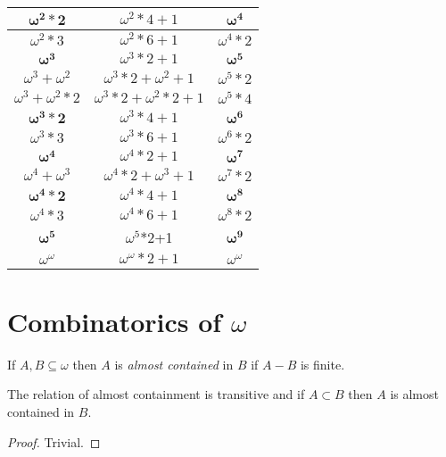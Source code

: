 \documentclass[oneside,12pt]{amsart}
\begin{document}
\begin{tabular}{|c|c|c|}
$\boldsymbol{\omega^2  *2}$ & $\omega^2*4+  1$ & $\boldsymbol{\omega^4}$ \\ \hline \hline
$\omega^2  *3$ & $\omega^2*6+  1$ & $\omega^4*2$ \\ \hline \hline
$\boldsymbol{\omega^3}$ & $\omega^3*2+  1$ & $\boldsymbol{\omega^5}$ \\ \hline \hline
$\omega^3 + \omega^2$ & $\omega^3 *2+ \omega^2 + 1$ & $\omega^5*2$ \\ \hline \hline
$\omega^3 + \omega^2*2$ & $\omega^3*2 + \omega^2*2 + 1$ & $\omega^5*4$ \\ \hline \hline
$\boldsymbol{\omega^3*2}$ & $\omega^3*4+1$ & $\boldsymbol{\omega^6}$ \\ \hline \hline
$\omega^3*3$ & $\omega^3*6+1$ & $\omega^6*2$ \\ \hline \hline
$\boldsymbol{\omega^4}$ & $\omega^4*2+1$ & $\boldsymbol{\omega^7}$ \\ \hline \hline
$\omega^4 + \omega^3$ & $\omega^4*2 + \omega^3 + 1$ & $\omega^7*2$ \\ \hline \hline
$\boldsymbol{\omega^4*2}$ & $\omega^4*4+1$ & $\boldsymbol{\omega^8}$ \\ \hline \hline
$\omega^4*3$ & $\omega^4*6+1$ & $\omega^8*2$ \\ \hline \hline
$\boldsymbol{\omega^5}$ &  $\omega^5$*2+1 & $\boldsymbol{\omega^9}$ \\ \hline \hline
$\omega^{\omega}$ & $\omega^{\omega}*2 + 1$ & $\omega^{\omega}$ \\ \hline \hline

\end{tabular}

\section{Combinatorics of $\omega$}
\begin{definition}
If $A,B \subseteq \omega$ then $A$ is  \emph{almost contained} in $B$ if
$A - B$ is finite.
\end{definition}

\begin{lemma}
The relation of almost containment is transitive and if $A\subset B$ then
$A$ is almost contained in $B$.
\end{lemma}
\begin{proof}
Trivial.
\end{proof}
\end{document}
